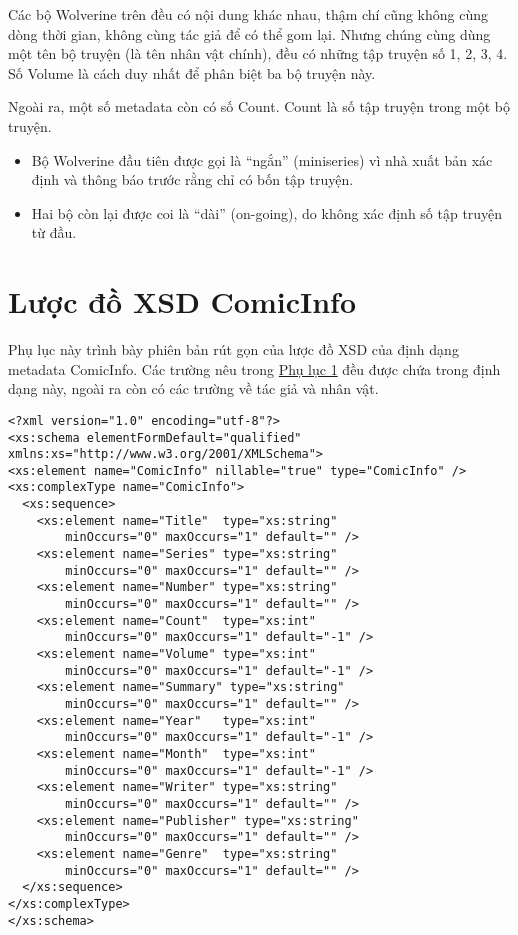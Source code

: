 \documentclass[../../../thesis]{subfiles}
\begin{document}
\begin{appendices}
Các bộ Wolverine trên đều có nội dung khác nhau, thậm chí cũng không cùng dòng
thời gian, không cùng tác giả để có thể gom lại. Nhưng chúng cùng dùng một tên
bộ truyện (là tên nhân vật chính), đều có những tập truyện số 1, 2, 3, 4. Số
Volume là cách duy nhất để phân biệt ba bộ truyện này.

Ngoài ra, một số metadata còn có số Count. Count là số tập truyện trong một bộ
truyện.

\begin{itemize}
    \item
        Bộ Wolverine đầu tiên được gọi là ``ngắn'' (miniseries) vì nhà xuất bản
        xác định và thông báo trước rằng chỉ có bốn tập truyện.
    \item
        Hai bộ còn lại được coi là ``dài'' (on-going), do không xác định số tập
        truyện từ đầu.
\end{itemize}



\chapter{Lược đồ XSD ComicInfo}

Phụ lục này trình bày phiên bản rút gọn của lược đồ XSD của định dạng metadata
ComicInfo. Các trường nêu trong \protect\hyperlink{P9.1-metadata}{Phụ lục 1} đều
được chứa trong định dạng này, ngoài ra còn có các trường về tác giả và nhân
vật.


\begin{verbatim}
<?xml version="1.0" encoding="utf-8"?>
<xs:schema elementFormDefault="qualified" xmlns:xs="http://www.w3.org/2001/XMLSchema">
<xs:element name="ComicInfo" nillable="true" type="ComicInfo" />
<xs:complexType name="ComicInfo">
  <xs:sequence>
    <xs:element name="Title"  type="xs:string"
        minOccurs="0" maxOccurs="1" default="" />
    <xs:element name="Series" type="xs:string"
        minOccurs="0" maxOccurs="1" default="" />
    <xs:element name="Number" type="xs:string"
        minOccurs="0" maxOccurs="1" default="" />
    <xs:element name="Count"  type="xs:int"
        minOccurs="0" maxOccurs="1" default="-1" />
    <xs:element name="Volume" type="xs:int"
        minOccurs="0" maxOccurs="1" default="-1" />
    <xs:element name="Summary" type="xs:string"
        minOccurs="0" maxOccurs="1" default="" />
    <xs:element name="Year"   type="xs:int"
        minOccurs="0" maxOccurs="1" default="-1" />
    <xs:element name="Month"  type="xs:int"
        minOccurs="0" maxOccurs="1" default="-1" />
    <xs:element name="Writer" type="xs:string"
        minOccurs="0" maxOccurs="1" default="" />
    <xs:element name="Publisher" type="xs:string"
        minOccurs="0" maxOccurs="1" default="" />
    <xs:element name="Genre"  type="xs:string"
        minOccurs="0" maxOccurs="1" default="" />
  </xs:sequence>
</xs:complexType>
</xs:schema>
\end{verbatim}

\end{appendices}
\end{document}
